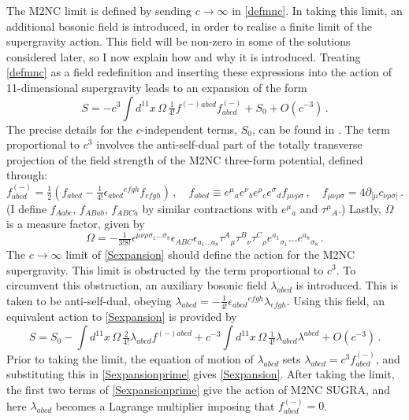 \documentclass[11pt]{article}
\newcommand{\be}{\begin{equation}}
\newcommand{\ee}{\end{equation}}
\numberwithin{equation}{section}
\begin{document}
{{The M2NC limit is defined by sending $c \rightarrow \infty$ in \eqref{defmnc}. 
In taking this limit, an additional bosonic field is introduced, in order to realise a finite limit of the supergravity action.
This field will be non-zero in some of the solutions considered later, so I now explain how and why it is introduced.
Treating \eqref{defmnc} as a field redefinition and inserting these expressions into the action of 11-dimensional supergravity leads to an expansion of the form
\be
S    = - c^3\int d^{11} x \,  \Omega\,\tfrac{1}{4!}   f^{(-)}{}^{abcd}  f^{(-)}_{abcd} + S_0 + O(c^{-3}) \,.
\label{Sexpansion}
\ee
The precise details for the $c$-independent terms, $S_0$, can be found in \cite{Blair:2021waq, Bergshoeff:2024nin}.
The term proportional to $c^3$ involves the anti-self-dual part of the totally transverse projection of the field strength of the M2NC three-form potential, defined through:
\be
f^{(-)}_{abcd} = \tfrac12 ( f_{abcd} - \tfrac{1}{4!} \epsilon_{abcd}{}^{efgh} f_{efgh} ) \,,\quad
f_{abcd} \equiv e^\mu{}_a e^\nu{}_b e^\rho{}_c e^\sigma{}_d f_{\mu\nu\rho\sigma}\,,\quad
f_{\mu\nu\rho\sigma} = 4 \partial_{[\mu} c_{\nu\rho\sigma]} \,.
\ee
(I define $f_{Aabc}$, $f_{ABab}$, $f_{ABCa}$ by similar contractions with $e^\mu{}_a$ and $\tau^\mu{}_A$.)
Lastly, $\Omega$ is a measure factor, given by
\be
\Omega = - \tfrac{1}{3!8!} \epsilon^{\mu \nu\rho\sigma_1 \dots \sigma_8} \epsilon_{ABC} \epsilon_{a_1 \dots a_8} \tau^A{}_{\mu} \tau^B{}_{\nu} \tau^C{}_{\rho} e^{a_1}{}_{\sigma_1} \dots e^{a_8}{}_{\sigma_8} \,.
\ee
The $c \rightarrow \infty$ limit of \eqref{Sexpansion} should define the action for the M2NC supergravity.
This limit is obstructed by the term proportional to $c^3$.
To circumvent this obstruction, an auxiliary bosonic field $\lambda_{abcd}$ is introduced. This is taken to be anti-self-dual, obeying $\lambda_{abcd} = - \tfrac{1}{4!} \epsilon_{abcd}{}^{efgh} \lambda_{efgh}$.
Using this field, an equivalent action to \eqref{Sexpansion} is provided by
\be
S    =  S_0- \int d^{11} x \,\Omega \,\tfrac{2}{4!}  \lambda_{abcd}  f^{(-) abcd}  + c^{-3} \int d^{11} x \,\Omega\, \tfrac{1}{4!}  \lambda_{abcd} \lambda^{abcd} + O(c^{-3}) \,.
\label{Sexpansionprime}
\ee
Prior to taking the limit, the equation of motion of $\lambda_{abcd}$ sets $\lambda_{abcd} = c^3f^{(-)}_{abcd}$, and substituting this in \eqref{Sexpansionprime} gives \eqref{Sexpansion}.
After taking the limit, the first two terms of \eqref{Sexpansionprime} give the action of M2NC SUGRA, and here 
$\lambda_{abcd}$ becomes a Lagrange multiplier imposing that $f^{(-)}_{abcd}=0$.

}}
\end{document}

